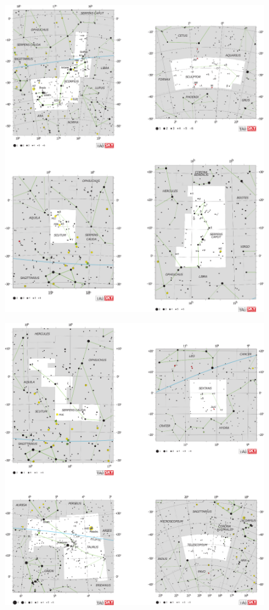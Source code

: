 \documentclass[a4paper,12pt]{extarticle}
\begin{document}
\clearpage
\begin{figure}
	\centering
	\includegraphics[width=\linewidth]{C19.eps}
\end{figure}
\clearpage
\begin{figure}
	\centering
	\includegraphics[width=\linewidth]{C20.eps}
\end{figure}
\end{document}
